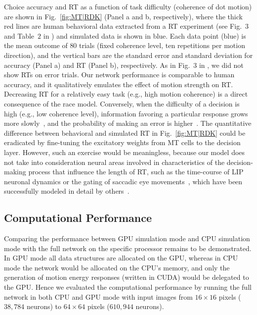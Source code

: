 Choice accuracy and \ac{RT} as a function of task difficulty
(coherence of dot motion) are shown in Fig.~\ref{fig:MT|RDK}
(Panel a and b, respectively), 
where the thick red lines are human behavioral
data extracted from a \ac{RT} experiment (see Fig.~$3$ and Table~$2$
in \cite{RoitmanShadlen2002}) and simulated data is shown in
blue. Each data point (blue) is the mean outcome of $80$ trials
(fixed coherence level, ten repetitions per motion direction),
and the vertical bars are the standard error and standard
deviation for accuracy (Panel a) and \ac{RT} (Panel b),
respectively. As in Fig.~$3$ in \cite{RoitmanShadlen2002},
we did not show \acp{RT} on error trials.
Our network performance is comparable to human accuracy,
and it qualitatively emulates the effect of motion strength
on \ac{RT}. Decreasing \ac{RT} for a relatively easy task (e.g., high
motion coherence) is a direct consequence of the race model.
Conversely, when the difficulty of a decision is high (e.g., low
coherence level), information favoring a particular response
grows more slowly~\citep{SmithRatcliff2004}, and the probability
of making an error is higher~\citep{ShadlenNewsome2001}. The
quantitative difference between behavioral and
simulated \ac{RT} in Fig.~\ref{fig:MT|RDK} could be eradicated 
by fine-tuning the excitatory weights from \ac{MT} cells to the
decision layer.
However, such an exercise would be meaningless, because
our model does not take into consideration neural areas involved
in characteristics of the decision-making process that
influence the length of \ac{RT}, such as the time-course of \ac{LIP}
neuronal dynamics or the gating of saccadic eye 
movements~\citep{ShadlenNewsome2001},
which have been successfully modeled in detail by 
others~\citep{GrossbergPilly2008}.


\subsection{Computational Performance}
\label{sec:MT|results|performance}

Comparing the performance between \ac{GPU} simulation
mode and \ac{CPU} simulation mode with the full network on
the specific processor remains to be demonstrated. In \ac{GPU}
mode all data structures are allocated on the \ac{GPU}, whereas in
\ac{CPU} mode the network would be allocated on the \ac{CPU}'s
memory, and only the generation of motion energy responses
(written in \ac{CUDA}) would be delegated to the \ac{GPU}. Hence we
evaluated the computational performance by running the full
network in both \ac{CPU} and \ac{GPU} mode with input images from
$16\times16$ pixels ($38,784$ neurons) to $64\times64$ pixels 
($610,944$ neurons).

